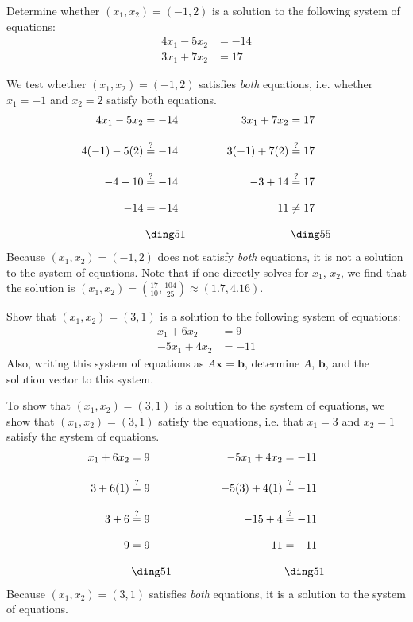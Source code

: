 \documentclass[11pt,letterpaper]{article}
\begin{document}

 Determine whether $(x_1, x_2)= (-1, 2)$ is a solution to the following system of equations:
	\[
	\begin{aligned}
	4x_1 - 5x_2&= -14 \\[0.3cm]
	3x_1 + 7x_2&= 17
	\end{aligned}
	\] \pspace

\sol We test whether $(x_1, x_2)= (-1, 2)$ satisfies \textit{both} equations, i.e. whether $x_1= -1$ and $x_2= 2$ satisfy both equations. 
	\[
	\begin{aligned}
	4x_1 - 5x_2&= -14 &\qquad\qquad 3x_1 + 7x_2&= 17 \\[0.3cm]
	4(-1) - 5(2)&\stackrel{?}{=} -14 & 3(-1) + 7(2)&\stackrel{?}{=} 17 \\[0.3cm]
	-4 - 10&\stackrel{?}{=} -14 & -3 + 14&\stackrel{?}{=} 17 \\[0.3cm]
	-14&= -14 & 11&\neq 17 \\[0.3cm]
	&\,\text{\cmark} & &\,\text{\xmark}
	\end{aligned}
	\]
Because $(x_1, x_2)= (-1, 2)$ does not satisfy \textit{both} equations, it is not a solution to the system of equations. Note that if one directly solves for $x_1$, $x_2$, we find that the solution is $(x_1, x_2)= \left( \frac{17}{10}, \frac{104}{25} \right) \approx (1.7, 4.16)$. 



\newpage



 Show that $(x_1, x_2)= (3, 1)$ is a solution to the following system of equations:
	\[
	\begin{aligned}
	x_1 + 6x_2&= 9 \\[0.3cm]
	-5x_1 + 4x_2&= -11
	\end{aligned}
	\]
Also, writing this system of equations as $A\mathbf{x}= \mathbf{b}$, determine $A$, $\mathbf{b}$, and the solution vector to this system. \pspace

\sol To show that $(x_1, x_2)= (3, 1)$ is a solution to the system of equations, we show that $(x_1, x_2)= (3, 1)$ satisfy the equations, i.e. that $x_1= 3$ and $x_2= 1$ satisfy the system of equations. 
	\[
	\begin{aligned}
	x_1 + 6x_2&= 9 &\qquad\qquad -5x_1 + 4x_2&= -11 \\[0.3cm]
	3 + 6(1)&\stackrel{?}{=} 9 & -5(3) + 4(1)&\stackrel{?}{=} -11 \\[0.3cm]
	3 + 6&\stackrel{?}{=} 9 & -15 + 4&\stackrel{?}{=} -11 \\[0.3cm]
	9&= 9 & -11&= -11 \\[0.3cm]
	&\,\text{\cmark} & &\,\text{\cmark}
	\end{aligned}
	\]
Because $(x_1, x_2)= (3, 1)$ satisfies \textit{both} equations, it is a solution to the system of equations. \pspace
\end{document}
